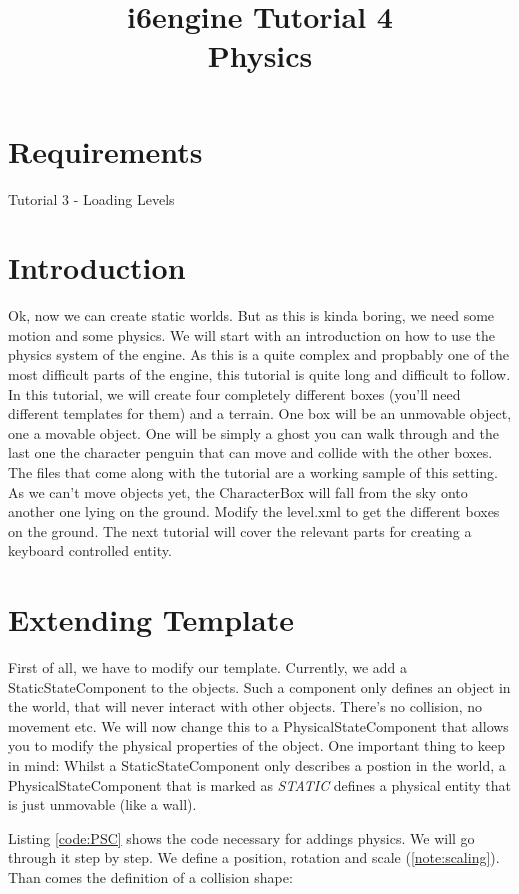 \documentclass{article}
\title{i6engine Tutorial 4 \\ Physics}
\begin{document}
\section{Requirements}

Tutorial 3 - Loading Levels

\section{Introduction}

Ok, now we can create static worlds. But as this is kinda boring, we need some motion and some physics. We will start with an introduction on how to use the physics system of the engine. As this is a quite complex and propbably one of the most difficult parts of the engine, this tutorial is quite long and difficult to follow.\newline
In this tutorial, we will create four completely different boxes (you'll need different templates for them) and a terrain. One box will be an unmovable object, one a movable object. One will be simply a ghost you can walk through and the last one the character penguin that can move and collide with the other boxes. The files that come along with the tutorial are a working sample of this setting. As we can't move objects yet, the CharacterBox will fall from the sky onto another one lying on the ground. Modify the level.xml to get the different boxes on the ground. The next tutorial will cover the relevant parts for creating a keyboard controlled entity.

\section{Extending Template}

First of all, we have to modify our template. Currently, we add a StaticStateComponent to the objects. Such a component only defines an object in the world, that will never interact with other objects. There's no collision, no movement etc. We will now change this to a PhysicalStateComponent that allows you to modify the physical properties of the object. One important thing to keep in mind: Whilst a StaticStateComponent only describes a postion in the world, a PhysicalStateComponent that is marked as \textit{STATIC} defines a physical entity that is just unmovable (like a wall).\newline

Listing \ref{code:PSC} shows the code necessary for addings physics. We will go through it step by step.\newline
We define a position, rotation and scale (\ref{note:scaling}). Than comes the definition of a collision shape:
\end{document}
